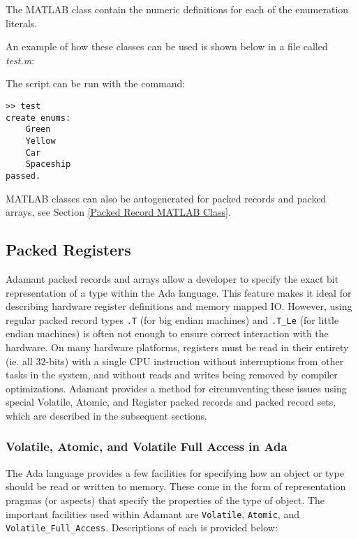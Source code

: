 The MATLAB class contain the numeric definitions for each of the enumeration literals.

An example of how these classes can be used is shown below in a file called \textit{test.m}:


The script can be run with the command:

\vspace{5mm} %
\begin{verbatim}
>> test
create enums:
    Green
    Yellow
    Car
    Spaceship
passed.
\end{verbatim}
\vspace{5mm} %

MATLAB classes can also be autogenerated for packed records and packed arrays, see Section \ref{Packed Record MATLAB Class}.

\subsection{Packed Registers}

Adamant packed records and arrays allow a developer to specify the exact bit representation of a type within the Ada language. This feature makes it ideal for describing hardware register definitions and memory mapped IO. However, using regular packed record types \texttt{.T} (for big endian machines) and \texttt{.T\_Le} (for little endian machines) is often not enough to ensure correct interaction with the hardware. On many hardware platforms, registers must be read in their entirety (ie. all 32-bits) with a single CPU instruction without interruptions from other tasks in the system, and without reads and writes being removed by compiler optimizations. Adamant provides a method for circumventing these issues using special Volatile, Atomic, and Register packed records and packed record sets, which are described in the subsequent sections.

\subsubsection{Volatile, Atomic, and Volatile Full Access in Ada}

The Ada language provides a few facilities for specifying how an object or type should be read or written to memory. These come in the form of representation pragmas (or aspects) that specify the properties of the type of object. The important facilities used within Adamant are \texttt{Volatile}, \texttt{Atomic}, and \texttt{Volatile\_Full\_Access}. Descriptions of each is provided below:

